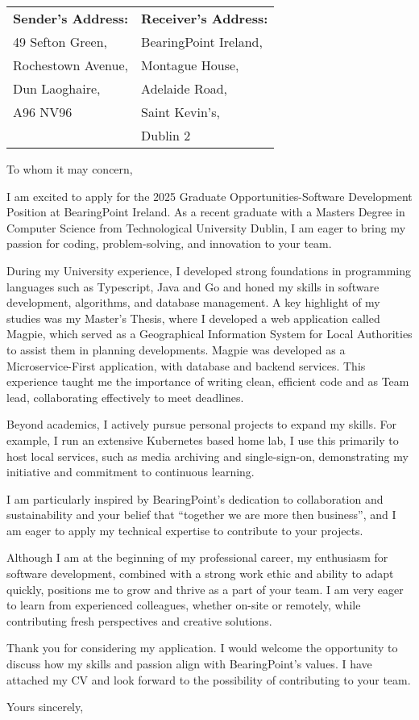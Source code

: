 \documentclass[11pt]{letter}
\begin{document}
\begin{letter}{}


\noindent\begin{tabular}{p{} p{}} \textbf{Sender's
    Address:} & \textbf{Receiver's Address:} \\
    49 Sefton Green, & BearingPoint Ireland, \\
    Rochestown Avenue, & Montague House, \\
    Dun Laoghaire, & Adelaide Road, \\
    A96 NV96 & Saint Kevin's, \\
    & Dublin 2 \\
    \end{tabular}


\opening{To whom it may concern,}

I am excited to apply for the 2025 Graduate Opportunities-Software Development
Position at BearingPoint Ireland. As a recent graduate with a Masters Degree in
Computer Science from Technological University Dublin, I am eager to bring my
passion for coding, problem-solving, and innovation to your team.

During my University experience, I developed strong foundations in programming
languages such as Typescript, Java and Go and honed my skills in software
development, algorithms, and database management. A key highlight of my studies
was my Master's Thesis, where I developed a web application called Magpie, which
served as a Geographical Information System for Local Authorities to assist them
in planning developments. Magpie was developed as a Microservice-First
application, with database and backend services. This experience taught me the
importance of writing clean, efficient code and as Team lead, collaborating
effectively to meet deadlines.

Beyond academics, I actively pursue personal projects to expand my skills. For
example, I run an extensive Kubernetes based home lab, I use this primarily to
host local services, such as media archiving and single-sign-on, demonstrating
my initiative and commitment to continuous learning.

I am particularly inspired by BearingPoint’s dedication to collaboration and
sustainability and your belief that ``together we are more then business'', and I
am eager to apply my technical expertise to contribute to your projects.

Although I am at the beginning of my professional career, my enthusiasm for
software development, combined with a strong work ethic and ability to adapt
quickly, positions me to grow and thrive as a part of your team. I am very eager
to learn from experienced colleagues, whether on-site or remotely, while
contributing fresh perspectives and creative solutions.

Thank you for considering my application. I would welcome the opportunity to
discuss how my skills and passion align with BearingPoint’s values. I have
attached my CV and look forward to the possibility of contributing to your team.

\closing{Yours sincerely,}

\end{letter}
\end{document}

